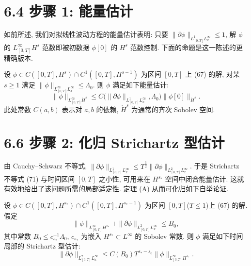 \section*{6.4 步骤 1: 能量估计}

如前所述, 我们对拟线性波动方程的能量估计表明: 只要 $\|\partial\phi\|_{L_{[0,T]}^1L_x^\infty}\leq 1$, 解 $\phi$ 的 $L_{[0,T]}^\infty H^s$ 范数即被初数据 $\phi[0]$ 的 $H^s$ 范数控制. 下面的命题是这一陈述的更精确版本.
\setcounter{mtthm}{4}%

\begin{proposition}[能量估计]\label{prop:6.5}
设 $\phi\in C([0,T],H^s)\cap C^1([0,T],H^{s-1})$ 为区间 $[0,T]$ 上 (67) 的解, 对某 $s\geq 1$ 满足 $\|\phi\|_{L_{[0,T]}^\infty L_x^\infty}\leq\Lambda_0$. 则 $\phi$ 满足如下能量估计:
\begin{equation}
\|\phi\|_{L_{[0,T]}^\infty\dot H^s}\leq C\bigl(\|\partial\phi\|_{L_{[0,T]}^1L_x^\infty},\Lambda_0\bigr)\|\phi[0]\|_{\dot H^s}.\end{equation}
此处常数 $C(a,b)$ 表示对 $a,b$ 的依赖, $\dot H^s$ 为通常的齐次 Sobolev 空间.\end{proposition}

\section*{6.6 步骤 2: 化归 Strichartz 型估计}

由 Cauchy--Schwarz 不等式, $\|\partial\phi\|_{L_{[0,T]}^1L_x^\infty}\leq T^{\frac12}\|\partial\phi\|_{L_{[0,T]}^2L_x^\infty}$. 于是 Strichartz 不等式 (71) 与时间区间 $[0,T]$ 之小性, 可用来在 $H^{s_*}$ 空间中闭合能量估计. 这就有效地给出了该问题所需的局部适定性. 定理 (A) 从而可化归如下自举论证.
\setcounter{mtthm}{6}%

\begin{theorem}[A1]\label{thm:6.7}
设 $\phi\in C([0,T],H^{s_*})\cap C^1([0,T],H^{s_*-1})$ 为区间 $[0,T]$($T\leq 1$)上 (67) 的解. 假定
\begin{equation}
\|\phi\|_{L_{[0,T]}^\infty H^{s_*}}+\|\partial\phi\|_{L_{[0,T]}^2L_x^\infty}\leq B_0,\end{equation}
其中常数 $B_0\leq c_{s_*}^{-1}\Lambda_0$, $c_{s_*}$ 为嵌入 $H^{s_*}\subset L^\infty$ 的 Sobolev 常数. 则 $\phi$ 满足如下时间局部的 Strichartz 型估计:
\begin{equation}
\|\partial\phi\|_{L_{[0,T]}^2L_x^\infty}\leq C(B_0)T^{s_*-s_0}\|\phi\|_{L_{[0,T]}^\infty H^{s_*}}.\end{equation}
\end{theorem}


